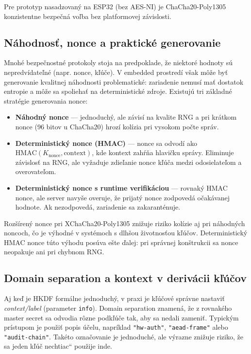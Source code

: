 \documentclass[journal,a4paper,onecolumn]{IEEEtran}
\newcommand{\uv}[1]{\quotedblbase#1\textquotedblleft}
\begin{document}
Pre prototyp nasadzovaný na ESP32 (bez AES-NI) je ChaCha20-Poly1305 konzistentne bezpečná voľba bez platformovej závislosti.

\subsection{Náhodnosť, nonce a praktické generovanie}

Mnohé bezpečnostné protokoly stoja na predpoklade, že niektoré hodnoty sú nepredvídateľné (napr. nonce, kľúče). V embedded prostredí však môže byť generovanie kvalitnej náhodnosti problematické: zariadenie nemusí mať dostatok entropie a môže sa spoliehať na deterministické zdroje. Existujú tri základné stratégie generovania nonce:

\begin{itemize}[leftmargin=*,itemsep=2pt]
  \item \textbf{Náhodný nonce} --- jednoduchý, ale závisí na kvalite RNG a pri krátkom nonce (96 bitov u ChaCha20) hrozí kolízia pri vysokom počte správ.
  \item \textbf{Deterministický nonce (HMAC)} --- nonce sa odvodí ako $\text{HMAC}(K_{\text{nonce}}, \text{context})$, kde kontext zahŕňa hlavičku správy. Eliminuje závislosť na RNG, ale vyžaduje zdieľanie nonce kľúča medzi odosielateľom a overovateľom.
  \item \textbf{Deterministický nonce s runtime verifikáciou} --- rovnaký HMAC nonce, ale server navyše overuje, že prijatý nonce zodpovedá očakávanej hodnote. Ak nezodpovedá, zariadenie sa zakaranténuje.
\end{itemize}

Rozšírený nonce pri XChaCha20-Poly1305 znižuje riziko kolízie aj pri náhodných noncoch\cite{LibsodiumXChaChaDoc}, čo je výhodné v systémoch s dlhšou životnosťou kľúčov. Deterministický HMAC nonce túto výhodu posúva ešte ďalej: pri správnej konštrukcii sa nonce neopakuje ani pri chybnom RNG.

\subsection{Domain separation a kontext v derivácii kľúčov}

Aj keď je HKDF formálne jednoduchý, v praxi je kľúčové správne nastaviť \emph{context/label} (parameter \texttt{info}). Domain separation znamená, že z rovnakého master secret sa odvodia rôzne podkľúče tak, aby sa nedali zameniť. Typickým prístupom je použiť popis účelu, napríklad \texttt{"hw-auth"}, \texttt{"aead-frame"} alebo \texttt{"audit-chain"}. Takéto označovanie je jednoduché, ale výrazne znižuje riziko, že sa jeden kľúč \uv{nechtiac} použije inde.
\end{document}
